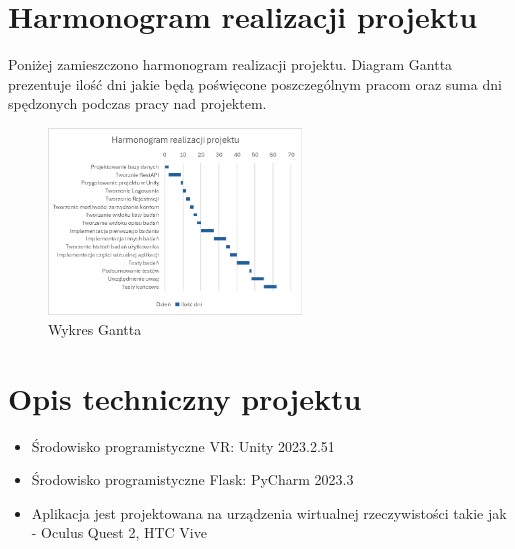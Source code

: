 \documentclass[12pt, letterpaper]{article}
\begin{document}
		
		\newpage
		\section{Harmonogram realizacji projektu}
		
		Poniżej zamieszczono harmonogram realizacji projektu. Diagram Gantta prezentuje ilość dni jakie będą poświęcone poszczególnym pracom oraz suma dni spędzonych podczas pracy nad projektem.
		
\begin{figure}[h]
  \centering
      \includegraphics[width=0.6\textwidth]{wykres_gantta}
  \caption{Wykres Gantta}
\end{figure}
		
		
		\section{Opis techniczny projektu}
		
		\begin{itemize}
				\item Środowisko programistyczne VR: Unity 2023.2.51
				\item Środowisko programistyczne Flask: PyCharm 2023.3
				\item Aplikacja jest projektowana na urządzenia wirtualnej rzeczywistości takie jak - Oculus Quest 2, HTC Vive
		\end{itemize}
			
		\newpage
\end{document}
